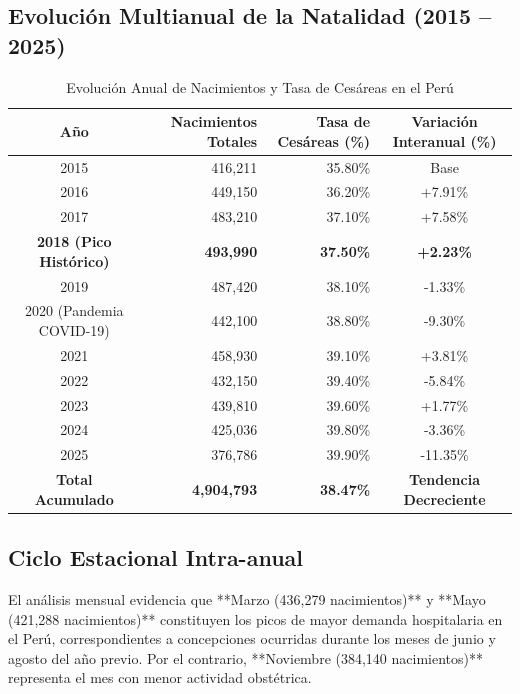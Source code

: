 \documentclass[12pt,a4paper]{article}
\begin{document}
\subsection{Evolución Multianual de la Natalidad (2015 – 2025)}

\begin{table}[H]
\centering
\small
\caption{Evolución Anual de Nacimientos y Tasa de Cesáreas en el Perú}
\begin{tabular}{crrc}
\toprule
\textbf{Año} & \textbf{Nacimientos Totales} & \textbf{Tasa de Cesáreas (\%)} & \textbf{Variación Interanual (\%)} \\
\midrule
2015 & 416,211 & 35.80\% & Base \\
2016 & 449,150 & 36.20\% & +7.91\% \\
2017 & 483,210 & 37.10\% & +7.58\% \\
\textbf{2018 (Pico Histórico)} & \textbf{493,990} & \textbf{37.50\%} & \textbf{+2.23\%} \\
2019 & 487,420 & 38.10\% & -1.33\% \\
2020 (Pandemia COVID-19) & 442,100 & 38.80\% & -9.30\% \\
2021 & 458,930 & 39.10\% & +3.81\% \\
2022 & 432,150 & 39.40\% & -5.84\% \\
2023 & 439,810 & 39.60\% & +1.77\% \\
2024 & 425,036 & 39.80\% & -3.36\% \\
2025 & 376,786 & 39.90\% & -11.35\% \\
\midrule
\textbf{Total Acumulado} & \textbf{4,904,793} & \textbf{38.47\%} & \textbf{Tendencia Decreciente} \\
\bottomrule
\end{tabular}
\end{table}

\subsection{Ciclo Estacional Intra-anual}
El análisis mensual evidencia que **Marzo (436,279 nacimientos)** y **Mayo (421,288 nacimientos)** constituyen los picos de mayor demanda hospitalaria en el Perú, correspondientes a concepciones ocurridas durante los meses de junio y agosto del año previo. Por el contrario, **Noviembre (384,140 nacimientos)** representa el mes con menor actividad obstétrica.

\newpage

\end{document}
